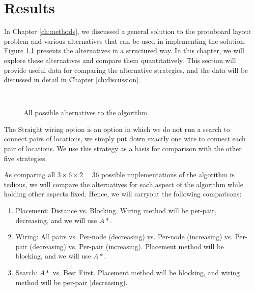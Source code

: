 
\chapter{Results}
\label{ch:results}

In Chapter \ref{ch:methods}, we discussed a general solution to the protoboard
layout problem and various alternatives that can be used in implementing the
solution. Figure \ref{fig:alternatives} presents the alternatives in a structured
way. In this chapter, we will explore these alternatives and compare them
quantitatively.
This section will provide useful data for comparing the alternative strategies,
and the data will be discussed in detail in Chapter \ref{ch:discussion}.

\begin{figure}[H]
\centering
{}
\hspace{1cm}
\\
\label{fig:alternatives}
\caption{All possible alternatives to the algorithm.}
\end{figure}

The Straight wiring option is an option in which we do not run a search to
connect pairs of locations, we simply put down exactly one wire to connect each
pair of locations. We use this strategy as a basis for comparison with the other
five strategies.

As comparing all $3 \times 6 \times 2 = 36$ possible implementations of the
algorithm is tedious, we
will compare the alternatives for each aspect of the algorithm while holding
other aspects fixed. Hence, we will carryout the following comparisons:

\begin{enumerate}
\item Placement: Distance vs. Blocking. Wiring method will be per-pair,
decreasing, and we will use $A*$.
\item Wiring: All pairs vs. Per-node (decreasing) vs. Per-node (increasing) vs.
Per-pair (decreasing) vs. Per-pair (increasing). Placement method will be
blocking, and we will use $A*$.
\item Search: $A*$ vs. Best First. Placement method will be blocking, and wiring
method will be per-pair (decreasing).
\end{enumerate}


